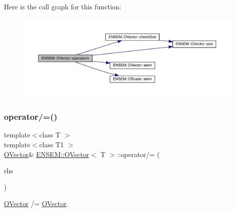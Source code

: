 Here is the call graph for this function\+:
\nopagebreak
\begin{figure}[H]
\begin{center}
\leavevmode
\includegraphics[width=350pt]{d0/d8d/classENSEM_1_1OVector_aa26be39a0620d0cdc1685bc2f1cc31a5_cgraph}
\end{center}
\end{figure}
\mbox{\label{classENSEM_1_1OVector_a61d1911393adf46629dd493ef09c1022}} 
\subsubsection{\texorpdfstring{operator/=()}{operator/=()}\hspace{0.1cm}{\footnotesize\ttfamily [4/6]}}
{\footnotesize\ttfamily template$<$class T $>$ \\
template$<$class T1 $>$ \\
\mbox{\hyperlink{classENSEM_1_1OVector}{O\+Vector}}\& \mbox{\hyperlink{classENSEM_1_1OVector}{E\+N\+S\+E\+M\+::\+O\+Vector}}$<$ T $>$\+::operator/= (\begin{DoxyParamCaption}\item[{const \mbox{\hyperlink{classENSEM_1_1OVector}{O\+Vector}}$<$ T1 $>$ \&}]{rhs }\end{DoxyParamCaption})\hspace{0.3cm}{\ttfamily [inline]}}



\mbox{\hyperlink{classENSEM_1_1OVector}{O\+Vector}} /= \mbox{\hyperlink{classENSEM_1_1OVector}{O\+Vector}}. 

